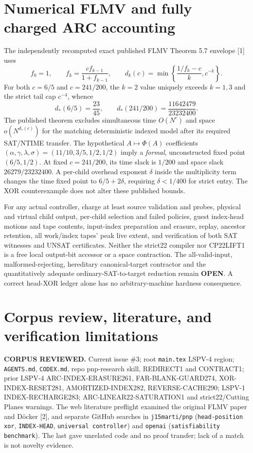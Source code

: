 \documentclass[10pt]{article}
\begin{document}
\section*{Numerical FLMV and fully charged ARC accounting}
The independently recomputed exact published FLMV Theorem 5.7 envelope [1] uses
\[
f_0=1,\qquad f_k=\frac{cf_{k-1}}{1+f_{k-1}},\qquad
 d_k(c)=\min\!\left\{\frac{1/f_k-c}{k},c^{-k}\right\}.
\]
For both $c=6/5$ and $c=241/200$, the $k=2$ value uniquely exceeds $k=1,3$ and the strict tail cap $c^{-4}$, whence
\[
d_*(6/5)=\frac{23}{45},\qquad d_*(241/200)=\frac{11642479}{23232400}.
\]
The published theorem excludes simultaneous time $O(N^c)$ and space $o(N^{d_*(c)})$ for the matching deterministic indexed model after its required SAT/NTIME transfer. The hypothetical $A\mapsto\Phi(A)$ coefficients $(\alpha,\gamma,\lambda,\sigma)=(11/10,3/5,1/2,1/2)$ imply a \emph{formal}, unconstructed fixed point $(6/5,1/2)$. At fixed $c=241/200$, its time slack is $1/200$ and space slack $26279/23232400$. A per-child overhead exponent $\delta$ inside the multiplicity term changes the time fixed point to $6/5+2\delta$, requiring $\delta<1/400$ for strict entry. The XOR counterexample does not alter these published bounds.

For any actual controller, charge at least source validation and probes, physical and virtual child output, per-child selection and failed policies, guest index-head motions and tape contents, input-index preparation and erasure, replay, ancestor retention, all work/index tapes' peak live extent, and verification of both SAT witnesses and UNSAT certificates. Neither the strict22 compiler nor CP22LIFT1 is a free local output-bit accessor or a space contraction. The all-valid-input, malformed-rejecting, hereditary canonical-target contractor and the quantitatively adequate ordinary-SAT-to-target reduction remain \textbf{OPEN}. A correct head-XOR ledger alone has no arbitrary-machine hardness consequence.

\section*{Corpus review, literature, and verification limitations}
\noindent\textbf{CORPUS REVIEWED.} Current issue \#3; root \texttt{main.tex} LSPV-4 region; \texttt{AGENTS.md}, \texttt{CODEX.md}, repo pnp-research skill, REDIRECT1 and CONTRACT1; prior LSPV-4 ARC-INDEX-ERASURE261, FAR-BLANK-GUARD274, XOR-INDEX-RESET281, AMORTIZED-INDEX282, REVERSE-CACHE290; LSPV-1 INDEX-RECHARGE283; ARC-LINEAR22-SATURATION1 and strict22/Cutting Planes warnings. The web literature preflight examined the original FLMV paper and D\"ocker [2], and separate GitHub searches in \texttt{j15marti/pnp} (\texttt{head-position xor}, \texttt{INDEX-HEAD}, \texttt{universal controller}) and \texttt{openai} (\texttt{satisfiability benchmark}). The last gave unrelated code and no proof transfer; lack of a match is not novelty evidence.
\end{document}
